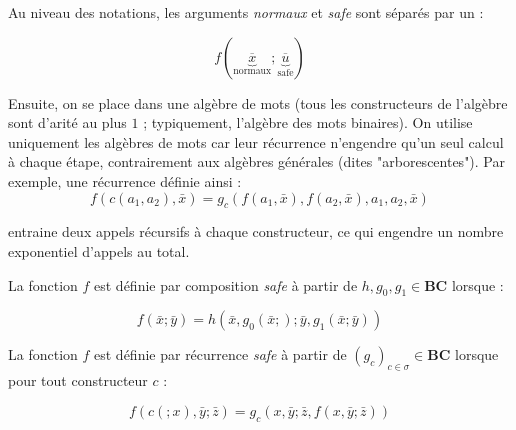 \documentclass{report}
\begin{document}
			Au niveau des notations, les arguments \emph{normaux} et \emph{safe} sont séparés par un \textquoted{;} :
			
			\[
				f(\underset{\text{normaux}}{\underbrace{\overline{x}}} ; \underset{\text{safe}}{\underbrace{\overline{u}}})
			\]
			
			Ensuite, on se place dans une algèbre de mots (tous les constructeurs de l'algèbre sont d'arité au plus $1$ ; typiquement, l'algèbre des mots binaires). On utilise uniquement les algèbres de mots car leur récurrence n'engendre qu'un seul calcul à chaque étape, contrairement aux algèbres générales (dites "arborescentes"). Par exemple, une récurrence définie ainsi : 
			\[
				f(c(a_1,a_2), \bar{x}) = g_c(f(a_1, \bar{x}),f(a_2, \bar{x}), a_1, a_2, \bar{x})
			\]
			
			entraine deux appels récursifs à chaque constructeur, ce qui engendre un nombre exponentiel d'appels au total. 
			
			\begin{definition}
				La fonction $f$ est définie par composition \emph{safe} à partir de $h, g_0, g_1 \in \textbf{BC}$ lorsque :
				
				\[
					f\left( \bar{x} ; \bar{y}\right) = h\left( \bar{x}, g_0( \bar{x}; ) ; \bar{y}, g_1( \bar{x}; \bar{y} ) \right)
				\]
			\end{definition}
			
			
			\begin{definition}
				La fonction $f$ est définie par récurrence \emph{safe} à partir de $\left(g_c\right)_{c \in \sigma} \in \textbf{BC}$ lorsque pour tout constructeur $c$ :
				
				\[
					f\left(c(;x), \bar{y} ; \bar{z}\right) = g_c\left( x, \bar{y} ; \bar{z}, f(x, \bar{y}; \bar{z}) \right)
				\]
			\end{definition}
			
\end{document}
